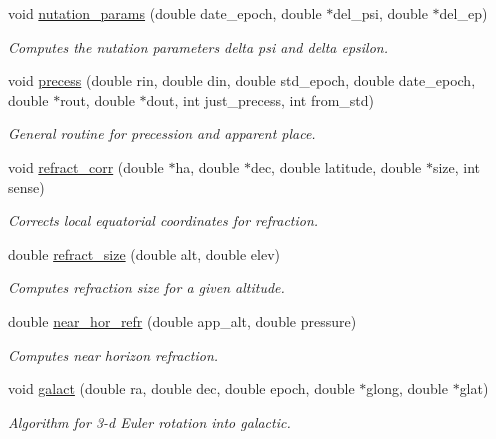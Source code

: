 \begin{DoxyCompactItemize}
void \hyperlink{class_astronomy_a7d56400d71ede859ea9866ceef4863a2}{nutation\-\_\-params} (double date\-\_\-epoch, double $\ast$del\-\_\-psi, double $\ast$del\-\_\-ep)
\begin{DoxyCompactList}\small\item\em Computes the nutation parameters delta psi and delta epsilon. \end{DoxyCompactList}\item 
void \hyperlink{class_astronomy_aeb0f764e8a505139d0ad8750691b2153}{precess} (double rin, double din, double std\-\_\-epoch, double date\-\_\-epoch, double $\ast$rout, double $\ast$dout, int just\-\_\-precess, int from\-\_\-std)
\begin{DoxyCompactList}\small\item\em General routine for precession and apparent place. \end{DoxyCompactList}\item 
void \hyperlink{class_astronomy_ac134844889e8ff7bb3fda22f831e1a3e}{refract\-\_\-corr} (double $\ast$ha, double $\ast$dec, double latitude, double $\ast$size, int sense)
\begin{DoxyCompactList}\small\item\em Corrects local equatorial coordinates for refraction. \end{DoxyCompactList}\item 
double \hyperlink{class_astronomy_aa73b80e20cb6a9d5b9e0ce4d85518a8e}{refract\-\_\-size} (double alt, double elev)
\begin{DoxyCompactList}\small\item\em Computes refraction size for a given altitude. \end{DoxyCompactList}\item 
double \hyperlink{class_astronomy_aeff446ad0e349bd9912d9a65742cd4bf}{near\-\_\-hor\-\_\-refr} (double app\-\_\-alt, double pressure)
\begin{DoxyCompactList}\small\item\em Computes near horizon refraction. \end{DoxyCompactList}\item 
void \hyperlink{class_astronomy_a36524559d3ba9bfead5c6b0a8edc8f68}{galact} (double ra, double dec, double epoch, double $\ast$glong, double $\ast$glat)
\begin{DoxyCompactList}\small\item\em Algorithm for 3-\/d Euler rotation into galactic. \end{DoxyCompactList}\item 

\end{DoxyCompactItemize}

